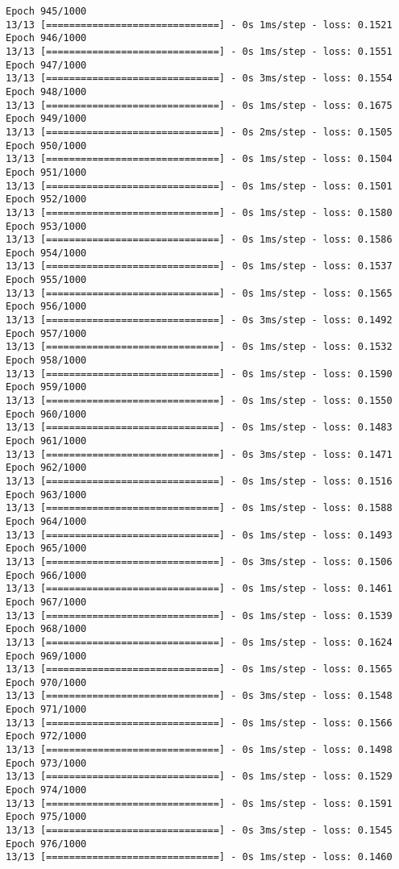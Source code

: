 \documentclass[11pt]{article}
\begin{document}
\begin{Verbatim}[commandchars=\\\{\}]
Epoch 945/1000
13/13 [==============================] - 0s 1ms/step - loss: 0.1521
Epoch 946/1000
13/13 [==============================] - 0s 1ms/step - loss: 0.1551
Epoch 947/1000
13/13 [==============================] - 0s 3ms/step - loss: 0.1554
Epoch 948/1000
13/13 [==============================] - 0s 1ms/step - loss: 0.1675
Epoch 949/1000
13/13 [==============================] - 0s 2ms/step - loss: 0.1505
Epoch 950/1000
13/13 [==============================] - 0s 1ms/step - loss: 0.1504
Epoch 951/1000
13/13 [==============================] - 0s 1ms/step - loss: 0.1501
Epoch 952/1000
13/13 [==============================] - 0s 1ms/step - loss: 0.1580
Epoch 953/1000
13/13 [==============================] - 0s 1ms/step - loss: 0.1586
Epoch 954/1000
13/13 [==============================] - 0s 1ms/step - loss: 0.1537
Epoch 955/1000
13/13 [==============================] - 0s 1ms/step - loss: 0.1565
Epoch 956/1000
13/13 [==============================] - 0s 3ms/step - loss: 0.1492
Epoch 957/1000
13/13 [==============================] - 0s 1ms/step - loss: 0.1532
Epoch 958/1000
13/13 [==============================] - 0s 1ms/step - loss: 0.1590
Epoch 959/1000
13/13 [==============================] - 0s 1ms/step - loss: 0.1550
Epoch 960/1000
13/13 [==============================] - 0s 1ms/step - loss: 0.1483
Epoch 961/1000
13/13 [==============================] - 0s 3ms/step - loss: 0.1471
Epoch 962/1000
13/13 [==============================] - 0s 1ms/step - loss: 0.1516
Epoch 963/1000
13/13 [==============================] - 0s 1ms/step - loss: 0.1588
Epoch 964/1000
13/13 [==============================] - 0s 1ms/step - loss: 0.1493
Epoch 965/1000
13/13 [==============================] - 0s 3ms/step - loss: 0.1506
Epoch 966/1000
13/13 [==============================] - 0s 1ms/step - loss: 0.1461
Epoch 967/1000
13/13 [==============================] - 0s 1ms/step - loss: 0.1539
Epoch 968/1000
13/13 [==============================] - 0s 1ms/step - loss: 0.1624
Epoch 969/1000
13/13 [==============================] - 0s 1ms/step - loss: 0.1565
Epoch 970/1000
13/13 [==============================] - 0s 3ms/step - loss: 0.1548
Epoch 971/1000
13/13 [==============================] - 0s 1ms/step - loss: 0.1566
Epoch 972/1000
13/13 [==============================] - 0s 1ms/step - loss: 0.1498
Epoch 973/1000
13/13 [==============================] - 0s 1ms/step - loss: 0.1529
Epoch 974/1000
13/13 [==============================] - 0s 1ms/step - loss: 0.1591
Epoch 975/1000
13/13 [==============================] - 0s 3ms/step - loss: 0.1545
Epoch 976/1000
13/13 [==============================] - 0s 1ms/step - loss: 0.1460

\end{Verbatim}
\end{document}
